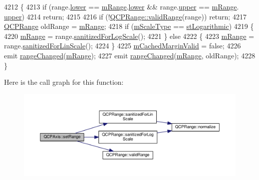 \begin{DoxyCode}
4212 \{
4213   \textcolor{keywordflow}{if} (range.\hyperlink{class_q_c_p_range_aa3aca3edb14f7ca0c85d912647b91745}{lower} == \hyperlink{class_q_c_p_axis_a1ee36773c49062d751560e11f90845f7}{mRange}.\hyperlink{class_q_c_p_range_aa3aca3edb14f7ca0c85d912647b91745}{lower} && range.\hyperlink{class_q_c_p_range_ae44eb3aafe1d0e2ed34b499b6d2e074f}{upper} == \hyperlink{class_q_c_p_axis_a1ee36773c49062d751560e11f90845f7}{mRange}.
      \hyperlink{class_q_c_p_range_ae44eb3aafe1d0e2ed34b499b6d2e074f}{upper})
4214     \textcolor{keywordflow}{return};
4215   
4216   \textcolor{keywordflow}{if} (!\hyperlink{class_q_c_p_range_ab38bd4841c77c7bb86c9eea0f142dcc0}{QCPRange::validRange}(range)) \textcolor{keywordflow}{return};
4217   \hyperlink{class_q_c_p_range}{QCPRange} oldRange = \hyperlink{class_q_c_p_axis_a1ee36773c49062d751560e11f90845f7}{mRange};
4218   \textcolor{keywordflow}{if} (\hyperlink{class_q_c_p_axis_ad706039549cbbbec5fcb2baf7894e04d}{mScaleType} == \hyperlink{class_q_c_p_axis_a36d8e8658dbaa179bf2aeb973db2d6f0abf5b785ad976618816dc6f79b73216d4}{stLogarithmic})
4219   \{
4220     \hyperlink{class_q_c_p_axis_a1ee36773c49062d751560e11f90845f7}{mRange} = range.\hyperlink{class_q_c_p_range_aaf6a9046e78d91eeb8e89584fe46b034}{sanitizedForLogScale}();
4221   \} \textcolor{keywordflow}{else}
4222   \{
4223     \hyperlink{class_q_c_p_axis_a1ee36773c49062d751560e11f90845f7}{mRange} = range.\hyperlink{class_q_c_p_range_a1ff029704c29a75adbc1dc36cecaf44c}{sanitizedForLinScale}();
4224   \}
4225   \hyperlink{class_q_c_p_axis_a2cde37b6e385f47e11322df4ac1b0e9b}{mCachedMarginValid} = \textcolor{keyword}{false};
4226   emit \hyperlink{class_q_c_p_axis_a0894084e4c16a1736534c4095746f910}{rangeChanged}(\hyperlink{class_q_c_p_axis_a1ee36773c49062d751560e11f90845f7}{mRange});
4227   emit \hyperlink{class_q_c_p_axis_a0894084e4c16a1736534c4095746f910}{rangeChanged}(\hyperlink{class_q_c_p_axis_a1ee36773c49062d751560e11f90845f7}{mRange}, oldRange);
4228 \}
\end{DoxyCode}


Here is the call graph for this function\+:\nopagebreak
\begin{figure}[H]
\begin{center}
\leavevmode
\includegraphics[width=350pt]{class_q_c_p_axis_aebdfea5d44c3a0ad2b4700cd4d25b641_cgraph}
\end{center}
\end{figure}




